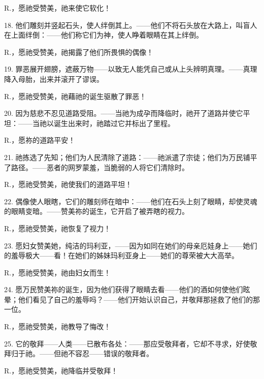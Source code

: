 R.，愿祂受赞美，祂来使它软化！\par

18. 他们雕刻并竖起石头，使人绊倒其上。——他们不将石头放在大路上，叫盲人在上面绊倒：——他们称它们为神，使人睁着眼睛在其上绊倒。\par

R.，愿祂受赞美，祂揭露了他们所畏惧的偶像！\par

19. 罪恶展开翅膀，遮蔽万物——以致无人能凭自己或从上头辨明真理。——真理降入母胎，出来并滚开了谬误。\par

R.，愿祂受赞美，祂藉祂的诞生驱散了罪恶！\par

20. 因为慈悲不忍见道路受阻。——当祂为成孕而降临时，祂开了道路并使它平坦：——当祂以诞生出来时，祂踏过它并标出了里程。\par

R.，愿祢的道路平安！\par

21. 祂拣选了先知；他们为人民清除了道路：——祂派遣了宗徒；他们为万民铺平了路径。——恶者的网罗蒙羞，当脆弱的人将它们清除时。\par

R.，愿祂受赞美，祂使我们的道路平坦！\par

22. 偶像使人眼瞎，它们的雕刻师在暗中：——他们在石头上刻了眼睛，却使灵魂的眼睛变暗。——赞美祢的诞生，它开启了被弄瞎的视力。\par

R.，愿祂受赞美，祂恢复了视力！\par

23. 愿妇女赞美她，纯洁的玛利亚，——因为如同在她们的母亲厄娃身上——她们的羞辱极大——看！在她们的姊妹玛利亚身上——她们的尊荣被大大高举。\par

R.，愿祂受赞美，祂由妇女而生！\par

24. 愿万民赞美祢的诞生，因为他们获得了眼睛去看——他们的酒如何使他们眩晕；他们看见了自己的羞辱吗？——他们开始认识自己，并敬拜那拯救了他们的那一位。\par

R.，愿祂受赞美，祂教导了悔改！\par

25. 它的敬拜——人类——已散布各处：——那应受敬拜者，它却不寻求，好使敬拜归于祂。——但祂不容忍——错误的敬拜者。\par

R.，愿祂受赞美，祂降临并受敬拜！\par

